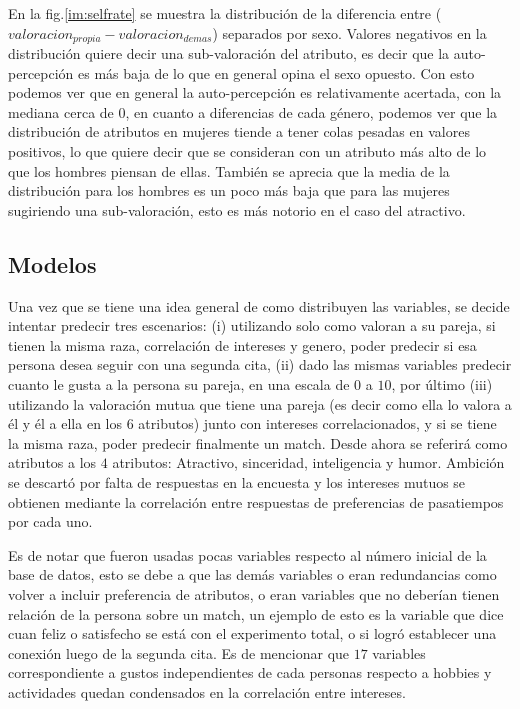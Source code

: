En la fig.\ref{im:selfrate} se muestra la distribución de la diferencia entre ($valoracion_{propia} - valoracion_{demas}$) separados por sexo. Valores negativos en la distribución quiere decir una sub-valoración del atributo, es decir que la auto-percepción es más baja de lo que en general opina el sexo opuesto. Con esto podemos ver que en general la auto-percepción es relativamente acertada, con la mediana cerca de $0$, en cuanto a diferencias de cada género, podemos ver que la distribución de atributos en mujeres tiende a tener colas pesadas en valores positivos, lo que quiere decir que se consideran con un atributo más alto de lo que los hombres piensan de ellas. También se aprecia que la media de la distribución para los hombres es un poco más baja que para las mujeres sugiriendo una sub-valoración, esto es más notorio en el caso del atractivo.



\subsection{Modelos}
Una vez que se tiene una idea general de como distribuyen las variables, se decide intentar predecir tres escenarios: (i) utilizando solo como valoran a su pareja, si tienen la misma raza, correlación de intereses y genero, poder predecir si esa persona desea seguir con una segunda cita, (ii) dado las mismas variables predecir cuanto le gusta a la persona su pareja, en una escala de $0$ a $10$, por último (iii) utilizando la valoración mutua que tiene una pareja (es decir como ella lo valora a él y él a ella en los 6 atributos) junto con intereses correlacionados, y si se tiene la misma raza, poder predecir finalmente un match. Desde ahora se referirá como atributos a los $4$ atributos: Atractivo, sinceridad, inteligencia y humor. Ambición se descartó por falta de respuestas en la encuesta y los intereses mutuos se obtienen mediante la correlación entre respuestas de preferencias de pasatiempos por cada uno.

Es de notar que fueron usadas pocas variables respecto al número inicial de la base de datos, esto se debe a que las demás variables o eran redundancias como volver a incluir preferencia de atributos, o eran variables que no deberían tienen relación de la persona sobre un match, un ejemplo de esto es la variable que dice cuan feliz o satisfecho se está con el experimento total, o si logró establecer una conexión luego de la segunda cita. Es de mencionar que $17$ variables correspondiente a gustos independientes de cada personas respecto a hobbies y actividades quedan condensados en la correlación entre intereses.

